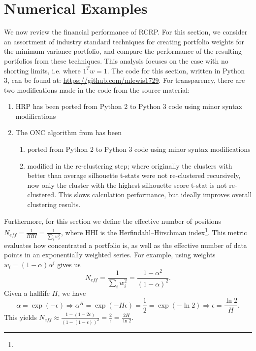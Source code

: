\documentclass[10pt,twoside,titlepage]{article}   %
\begin{document}
\section{Numerical Examples}\label{sec-Simulation}
We now review the financial performance of RCRP. 
For this section, we consider an assortment of industry standard techniques for creating portfolio weights for the minimum variance portfolio, 
and compare the performance of the resulting portfolios from these techniques. 
This analysis focuses on the case with no shorting limits, i.e. where $1^Tw=1$.
The code for this section, written in Python 3, can be found at: \url{https://github.com/mlewis1729}. 
For transparency, there are two modifications made in the code from the source material:
\begin{enumerate}
\item HRP has been ported from Python 2 to Python 3 code using minor syntax modifications
\item The ONC algorithm from \cite{LopezAndLewis} has been
\begin{enumerate}
\item ported from Python 2 to Python 3 code using minor syntax modifications
\item modified in the re-clustering step; where originally the clusters with better than average silhouette t-stats were not re-clustered recursively, 
now only the cluster with the highest silhouette score t-stat is not re-clustered. This slows calculation performance, but ideally improves overall clustering results.
\end{enumerate}
\end{enumerate}
Furthermore, for this section we define the effective number of positions $N_{eff}=\frac{1}{HHI}=\frac{1}{\sum_i w_i^2}$, where HHI is the Herfindahl–Hirschman index\footnote{\HHIURL}.
This metric evaluates how concentrated a portfolio is, as well as the effective number of data points in an exponentially weighted series.
For example, using weights $w_i = (1-\alpha) \alpha^i$ gives us
\[
N_{eff} = \frac{1}{\sum_i w_i^2} = \frac{ 1 - \alpha^2 }{ (1 - \alpha)^2 }.
\]
Given a halflife $H$, we have 
\[
\alpha = \exp(-\epsilon) \Rightarrow \alpha^H = \exp(-H \epsilon ) = \frac{1}{2} = \exp( - \ln 2 ) \Rightarrow \epsilon = \frac{ \ln 2 }{ H }.
\]
This yields $N_{eff} \approx \frac{ 1 - ( 1 - 2 \epsilon ) }{ ( 1 - (1-\epsilon) )^2 } = \frac{ 2 }{ \epsilon } = \frac{ 2 H }{ \ln 2 }$.
\end{document}
